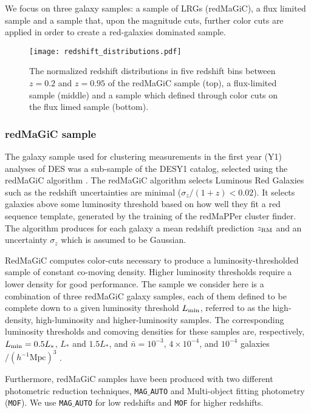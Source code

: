 \documentclass[a4paper,fleqn,usenatbib]{mnras}
\begin{document}
We focus on three galaxy samples: a sample of LRGs (redMaGiC), a flux limited sample and a sample that, upon the magnitude cuts, further color cuts are applied in order to create a red-galaxies dominated sample.


\begin{figure}
\centering
\texttt{[image: redshift\_distributions.pdf]} 
\caption{The normalized redshift distributions in five redshift bins between $z=0.2$ and $z=0.95$ of  the redMaGiC sample (top), a flux-limited sample (middle) and a sample which defined through color cuts  on the flux limed sample (bottom).}
\label{fig: Red_dist_data}
\end{figure}

\subsubsection{redMaGiC sample}
\label{subsubsec: redmag}

The galaxy sample used for clustering measurements in the first year (Y1) analyses of DES was a sub-sample of the DESY1 catalog, selected using  the redMaGiC algorithm \citep{Rozo2016}. The redMaGiC algorithm selects Luminous Red Galaxies such as the redshift uncertainties are minimal ($\sigma_z/(1+z) <0.02$).  It selects galaxies above some luminosity threshold based on how well they fit a red sequence template, generated by the training of the redMaPPer cluster finder. The algorithm  produces for each galaxy a mean redshift prediction $z_{\mbox{\scriptsize{RM}}}$  and an uncertainty $\sigma_z$ which is assumed to be Gaussian.

RedMaGiC computes color-cuts necessary to produce a luminosity-thresholded sample of constant co-moving density. Higher luminosity thresholds require a lower density for good performance. The sample we consider here is a combination of three redMaGiC galaxy samples, each of them defined to be complete down to a given luminosity threshold $L_{\mbox{\scriptsize{min}}}$, referred to as the high-density, high-luminosity and higher-luminosity samples. The corresponding luminosity thresholds and comoving densities for these samples are, respectively, $L_{\mbox{\scriptsize{min}}} =0.5L_*$, $L_*$ and $1.5L_*$, and $\bar{n} =10^{-3}, \,4 \times 10^{-4}$, and $10^{-4}$ galaxies$/(h^{-1} \mbox{Mpc})^3$ \citep{Elvin_Poole2018}.

Furthermore, redMaGiC samples have been produced with two different photometric reduction techniques, \texttt{MAG{$\_$}AUTO} and Multi-object fitting photometry (\texttt{MOF}). We use \texttt{MAG{$\_$}AUTO}  for low redshifts and \texttt{MOF} for higher redshifts. 
\end{document}
